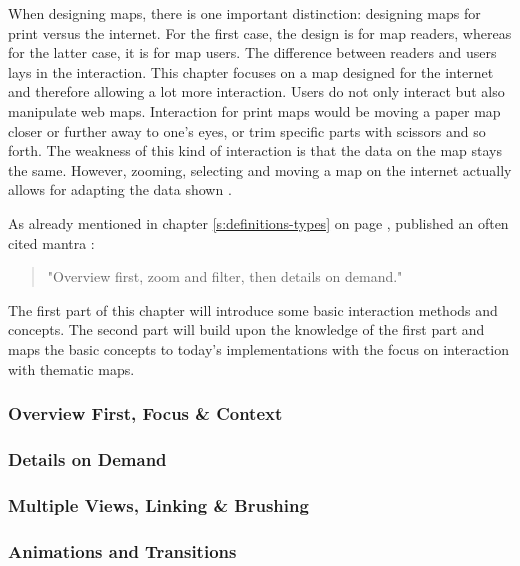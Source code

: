 When designing maps, there is one important distinction: designing maps for print versus the internet. For the first case, the design is for map readers, whereas for the latter case, it is for map users. The difference between readers and users lays in the interaction. This chapter focuses on a map designed for the internet and therefore allowing a lot more interaction. Users do not only interact but also manipulate web maps. Interaction for print maps would be moving a paper map closer or further away to one's eyes, or trim specific parts with scissors and so forth. The weakness of this kind of interaction is that the data on the map stays the same. However, zooming, selecting and moving a map on the internet actually allows for adapting the data shown .

As already mentioned in chapter \ref{s:definitions-types} on page \pageref{s:definitions-types}, \citeauthor{Shneiderman1996} published an often cited mantra :
\begin{quote}
"Overview first, zoom and filter, then details on demand."
\end{quote}



The first part of this chapter will introduce some basic interaction methods and concepts. The second part will build upon the knowledge of the first part and maps the basic concepts to today's implementations with the focus on interaction with thematic maps.

\subsubsection{Overview First, Focus \& Context}


\subsubsection{Details on Demand}


\subsubsection{Multiple Views, Linking \& Brushing}
\label{s:linking-brushing}


\subsubsection{Animations and Transitions}


